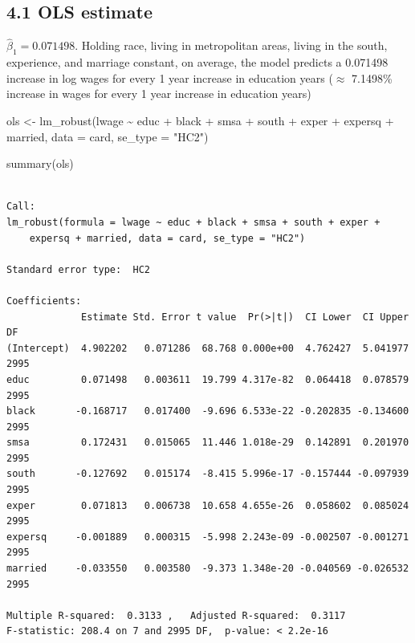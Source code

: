 \documentclass[
  letterpaper,
  DIV=11,
  numbers=noendperiod]{scrartcl}
\newenvironment{Shaded}{\begin{snugshade}}{\end{snugshade}}
\newcommand{\AttributeTok}[1]{\textcolor[rgb]{0.40,0.45,0.13}{#1}}
\newcommand{\FunctionTok}[1]{\textcolor[rgb]{0.28,0.35,0.67}{#1}}
\newcommand{\NormalTok}[1]{\textcolor[rgb]{0.00,0.23,0.31}{#1}}
\newcommand{\OtherTok}[1]{\textcolor[rgb]{0.00,0.23,0.31}{#1}}
\newcommand{\SpecialCharTok}[1]{\textcolor[rgb]{0.37,0.37,0.37}{#1}}
\newcommand{\StringTok}[1]{\textcolor[rgb]{0.13,0.47,0.30}{#1}}
\begin{document}
\subsection{4.1 OLS estimate}\label{ols-estimate}

\(\hat{\beta}_1 = 0.071498\). Holding race, living in metropolitan
areas, living in the south, experience, and marriage constant, on
average, the model predicts a 0.071498 increase in log wages for every 1
year increase in education years (\(\approx\) 7.1498\% increase in wages
for every 1 year increase in education years)

\begin{Shaded}
\begin{Highlighting}[]
\NormalTok{ols }\OtherTok{\textless{}{-}} \FunctionTok{lm\_robust}\NormalTok{(lwage }\SpecialCharTok{\textasciitilde{}}\NormalTok{ educ }\SpecialCharTok{+}\NormalTok{ black }\SpecialCharTok{+}\NormalTok{ smsa }\SpecialCharTok{+}\NormalTok{ south }\SpecialCharTok{+}\NormalTok{ exper }\SpecialCharTok{+}\NormalTok{ expersq }\SpecialCharTok{+}\NormalTok{ married,}
                 \AttributeTok{data =}\NormalTok{ card, }\AttributeTok{se\_type =} \StringTok{"HC2"}\NormalTok{)}

\FunctionTok{summary}\NormalTok{(ols)}
\end{Highlighting}
\end{Shaded}

\begin{verbatim}

Call:
lm_robust(formula = lwage ~ educ + black + smsa + south + exper + 
    expersq + married, data = card, se_type = "HC2")

Standard error type:  HC2 

Coefficients:
             Estimate Std. Error t value  Pr(>|t|)  CI Lower  CI Upper   DF
(Intercept)  4.902202   0.071286  68.768 0.000e+00  4.762427  5.041977 2995
educ         0.071498   0.003611  19.799 4.317e-82  0.064418  0.078579 2995
black       -0.168717   0.017400  -9.696 6.533e-22 -0.202835 -0.134600 2995
smsa         0.172431   0.015065  11.446 1.018e-29  0.142891  0.201970 2995
south       -0.127692   0.015174  -8.415 5.996e-17 -0.157444 -0.097939 2995
exper        0.071813   0.006738  10.658 4.655e-26  0.058602  0.085024 2995
expersq     -0.001889   0.000315  -5.998 2.243e-09 -0.002507 -0.001271 2995
married     -0.033550   0.003580  -9.373 1.348e-20 -0.040569 -0.026532 2995

Multiple R-squared:  0.3133 ,   Adjusted R-squared:  0.3117 
F-statistic: 208.4 on 7 and 2995 DF,  p-value: < 2.2e-16
\end{verbatim}
\end{document}
